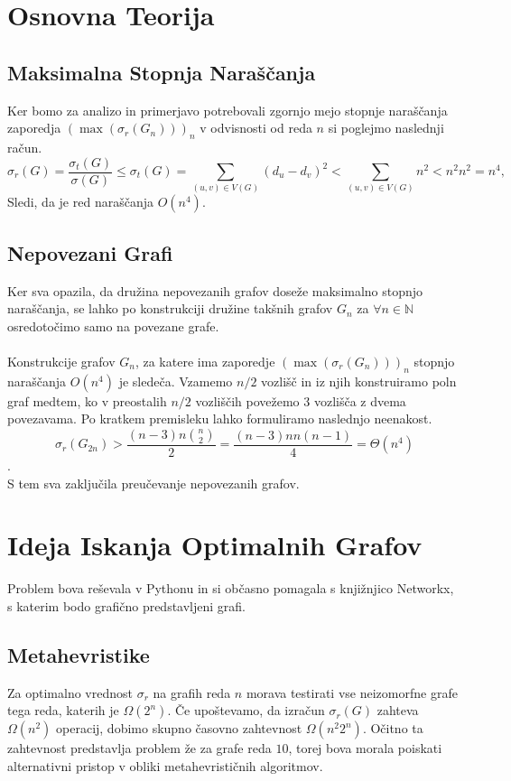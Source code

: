 \documentclass[ letterpaper, titlepage, fleqn]{article}
\begin{document}
\section{Osnovna Teorija}

\subsection{Maksimalna Stopnja Naraščanja}
Ker bomo za analizo in primerjavo potrebovali zgornjo mejo stopnje naraščanja
zaporedja $(\max(\sigma_r(G_n)))_n$ v odvisnosti od reda $n$ si poglejmo 
naslednji račun.
$$
\sigma_r(G) = \frac{\sigma_t(G)}{\sigma(G)} 
\leq \sigma_t(G)
= \sum_{(u, v) \in V(G)}(d_u - d_v)^2 
< \sum_{(u, v) \in V(G)}n^2
< n^2  n^2 = n^4,
$$
Sledi, da je red naraščanja $O(n^4)$.

\subsection{Nepovezani Grafi}
Ker sva opazila, da družina nepovezanih grafov doseže maksimalno stopnjo naraščanja,
se lahko po konstrukciji družine takšnih grafov $G_n$ za $\forall n \in \mathbb{N}$
osredotočimo samo na povezane grafe.
\\\\
Konstrukcije grafov $G_n$, za katere ima zaporedje $(\max(\sigma_r(G_n)))_n$ stopnjo 
naraščanja $O(n^4)$ je sledeča.
Vzamemo $n / 2$ vozlišč in iz njih konstruiramo poln graf
medtem, ko v preostalih $n /2$ vozliščih povežemo 3 vozlišča z dvema povezavama.
Po kratkem premisleku lahko formuliramo naslednjo neenakost.
$$\sigma_r(G_{2n}) > \frac{(n - 3)n \binom{n}{2}}{2} = \frac{(n - 3)n n(n - 1)}{4} = \Theta(n^4)$$.
\\
S tem sva zaključila preučevanje nepovezanih grafov.

\section{Ideja Iskanja Optimalnih Grafov}
Problem bova reševala v Pythonu in si občasno pomagala s knjižnjico Networkx,  
s katerim bodo grafično predstavljeni grafi.

\subsection{Metahevristike}
Za optimalno vrednost $\sigma_r$ na grafih reda $n$ morava testirati vse neizomorfne
grafe tega reda, katerih je $\Omega(2^n)$. Če upoštevamo, da izračun $\sigma_r(G)$ 
zahteva $\Omega(n^2)$ operacij, dobimo skupno časovno zahtevnost $\Omega(n^2 2^n)$.
Očitno ta zahtevnost predstavlja problem že za grafe reda $10$, 
torej bova morala poiskati alternativni pristop v obliki metahevrističnih algoritmov. \\
\end{document}

